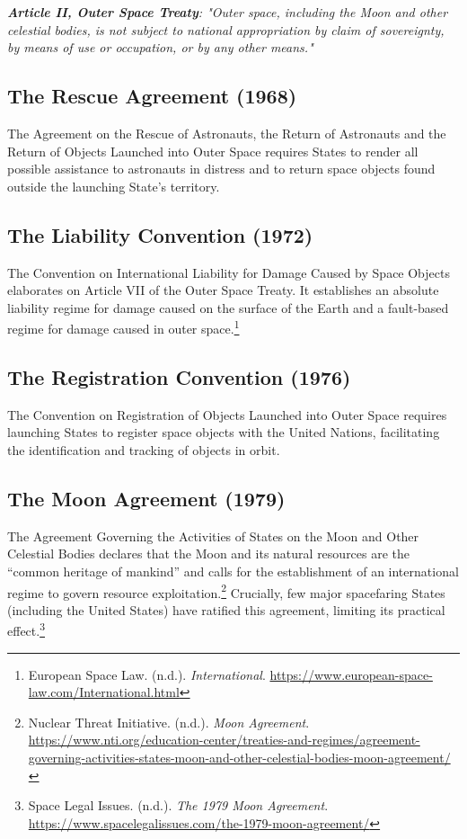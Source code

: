 \emph{\textbf{Article II, Outer Space Treaty}}\emph{: "Outer space, including the Moon and other celestial bodies, is not subject to national appropriation by claim of sovereignty, by means of use or occupation, or by any other means."}

\subsection{The Rescue Agreement (1968)}

The Agreement on the Rescue of Astronauts, the Return of Astronauts and the Return of Objects Launched into Outer Space requires States to render all possible assistance to astronauts in distress and to return space objects found outside the launching State's territory.

\subsection{The Liability Convention (1972)}

The Convention on International Liability for Damage Caused by Space Objects elaborates on Article VII of the Outer Space Treaty. It establishes an absolute liability regime for damage caused on the surface of the Earth and a fault-based regime for damage caused in outer space.\footnote{European Space Law. (n.d.). \emph{International}. \url{https://www.european-space-law.com/International.html}}

\subsection{The Registration Convention (1976)}

The Convention on Registration of Objects Launched into Outer Space requires launching States to register space objects with the United Nations, facilitating the identification and tracking of objects in orbit.

\subsection{The Moon Agreement (1979)}

The Agreement Governing the Activities of States on the Moon and Other Celestial Bodies declares that the Moon and its natural resources are the “common heritage of mankind” and calls for the establishment of an international regime to govern resource exploitation.\footnote{Nuclear Threat Initiative. (n.d.). \emph{Moon Agreement}. \url{https://www.nti.org/education-center/treaties-and-regimes/agreement-governing-activities-states-moon-and-other-celestial-bodies-moon-agreement/}} Crucially, few major spacefaring States (including the United States) have ratified this agreement, limiting its practical effect.\footnote{Space Legal Issues. (n.d.). \emph{The 1979 Moon Agreement}. \url{https://www.spacelegalissues.com/the-1979-moon-agreement/}}

